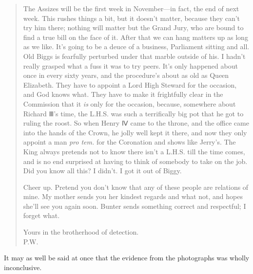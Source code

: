 \begin{quotation}
The Assizes will be the first week in November—in fact, the end of next week. This rushes things a bit, but it doesn't matter, because they can't try him there; nothing will matter but the Grand Jury, who are bound to find a true bill on the face of it. After that we can hang matters up as long as we like. It's going to be a deuce of a business, Parliament sitting and all. Old Biggs is fearfully perturbed under that marble outside of his. I hadn't really grasped what a fuss it was to try peers. It's only happened about once in every sixty years, and the procedure's about as old as Queen Elizabeth. They have to appoint a Lord High Steward for the occasion, and God knows what. They have to make it frightfully clear in the Commission that it \textit{is} only for the occasion, because, somewhere about Richard Ⅲ's time, the L.H.S. was such a terrifically big pot that he got to ruling the roost. So when Henry Ⅳ came to the throne, and the office came into the hands of the Crown, he jolly well kept it there, and now they only appoint a man \textit{pro tem.} for the Coronation and shows like Jerry's. The King always pretends not to know there isn't a L.H.S. till the time comes, and is no end surprised at having to think of somebody to take on the job. Did you know all this? I didn't. I got it out of Biggy.

Cheer up. Pretend you don't know that any of these people are relations of mine. My mother sends you her kindest regards and what not, and hopes she'll see you again soon. Bunter sends something correct and respectful; I forget what.

\begin{flushright}
Yours in the brotherhood of detection.\\
\textsc{P.W.}
\end{flushright}
\end{quotation}
It may as well be said at once that the evidence from the photographs was wholly inconclusive.
